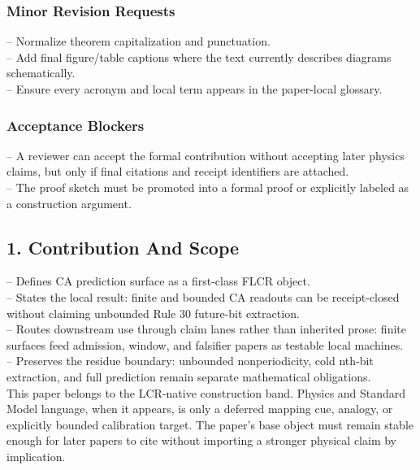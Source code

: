 \documentclass[11pt]{article}
\begin{document}
\subsubsection*{Minor Revision Requests}

\noindent{}-- Normalize theorem capitalization and punctuation.\\
\noindent{}-- Add final figure/table captions where the text currently describes diagrams schematically.\\
\noindent{}-- Ensure every acronym and local term appears in the paper-local glossary.\\

\subsubsection*{Acceptance Blockers}

\noindent{}-- A reviewer can accept the formal contribution without accepting later physics claims, but only if final citations and receipt identifiers are attached.\\
\noindent{}-- The proof sketch must be promoted into a formal proof or explicitly labeled as a construction argument.\\


\subsection*{1. Contribution And Scope}

\noindent{}-- Defines CA prediction surface as a first-class FLCR object.\\
\noindent{}-- States the local result: finite and bounded CA readouts can be receipt-closed without claiming unbounded Rule 30 future-bit extraction.\\
\noindent{}-- Routes downstream use through claim lanes rather than inherited prose: finite surfaces feed admission, window, and falsifier papers as testable local machines.\\
\noindent{}-- Preserves the residue boundary: unbounded nonperiodicity, cold nth-bit extraction, and full prediction remain separate mathematical obligations.\\

This paper belongs to the LCR-native construction band. Physics and Standard Model language, when it appears, is only a deferred mapping cue, analogy, or explicitly bounded calibration target. The paper's base object must remain stable enough for later papers to cite without importing a stronger physical claim by implication.
\end{document}
